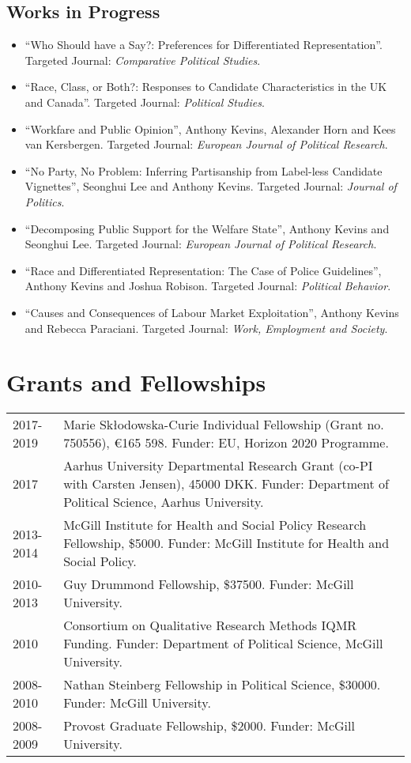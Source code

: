 \documentclass[letterpaper,fontsize=10pt]{scrartcl}
\begin{document}
	\vspace{-1.5em}
\subsection{Works in Progress}
	\vspace{-.5em}
	\begin{itemize}[noitemsep]
		\item ``Who Should have a Say?: Preferences for Differentiated Representation''. Targeted Journal: \textit{Comparative Political Studies}.
    \item ``Race, Class, or Both?: Responses to Candidate Characteristics in the UK and Canada''. Targeted Journal: \textit{Political Studies}.
		\item ``Workfare and Public Opinion'', Anthony Kevins, Alexander Horn and Kees van Kersbergen. Targeted Journal: \textit{European Journal of Political Research}.
    \item ``No Party, No Problem: Inferring Partisanship from Label-less Candidate Vignettes'', Seonghui Lee and Anthony Kevins. Targeted Journal: \textit{Journal of Politics}.
  	\item ``Decomposing Public Support for the Welfare State'', Anthony Kevins and Seonghui Lee. Targeted Journal: \textit{European Journal of Political Research}.
		\item ``Race and Differentiated Representation: The Case of Police Guidelines'', Anthony Kevins and Joshua Robison. Targeted Journal: \textit{Political Behavior}.
    \item ``Causes and Consequences of Labour Market Exploitation'', Anthony Kevins and Rebecca Paraciani. Targeted Journal: \textit{Work, Employment and Society}.
	\end{itemize}

		\section{Grants and Fellowships}
		\vspace{-1.5em}
		\begin{tabularx}{\textwidth}{@{} l X @{} }
			2017-2019 & Marie Skłodowska-Curie Individual Fellowship (Grant no. 750556), €165 598. Funder: EU, Horizon 2020 Programme.\\
			2017 & Aarhus University Departmental Research Grant (co-PI with Carsten Jensen), 45000 DKK. Funder: Department of Political Science, Aarhus University.\\
			2013-2014 & McGill Institute for Health and Social Policy Research Fellowship, \$5000. Funder: McGill Institute for Health and Social Policy.\\
			2010-2013 & Guy Drummond Fellowship, \$37500. Funder: McGill University.\\
			2010 & Consortium on Qualitative Research Methods IQMR Funding. Funder: Department of Political Science, McGill University.\\
			2008-2010 & Nathan Steinberg Fellowship in Political Science, \$30000. Funder: McGill University.\\
			2008-2009 & Provost Graduate Fellowship, \$2000. Funder: McGill University.
		\end{tabularx}
\end{document}
